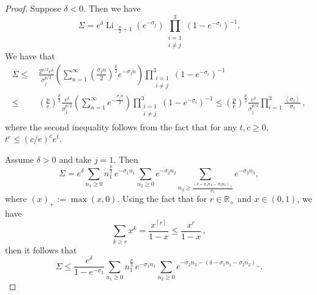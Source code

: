 \documentclass[10pt,a4paper]{amsart}
\newcommand		{\R}		{\RR}
\newcommand		{\RR}		{\mathbb R}			%
\newcommand		{\bangle}[1]	{\lt\langle #1\rt\rangle}
\newcommand		{\ceil}[1]		{\lt\lceil{#1}\rt\rceil}
\newcommand		{\lt}			{\left}				%
\newcommand		{\rt}			{\right}			%
\newcommand		{\weight}[1]	{\bangle{#1}}	%
\begin{document}
	\begin{proof}
        Suppose $\delta<0$. Then we have 
        \begin{equation*}
            \Sigma=e^\delta\operatorname{Li}_{-\frac{p}{2}+1}(e^{-\sigma_j}) \prod_{\substack{i=1\\ i\ne j}}^3 (1-e^{-\sigma_i})^{-1}.
        \end{equation*}
        We have that 
        \begin{align*}
            \Sigma \le&\, \frac{2^{p/2}e^\delta}{\sigma_j^{p/2}} \lt(\sum^\infty_{n=1} \lt(\frac{\sigma_j n}{2}\rt)^{\frac{p}{2}} e^{-\sigma_j n}\rt)\prod_{\substack{i=1\\ i\ne j}}^3 (1-e^{-\sigma_i})^{-1} \\
            \le&\, \lt(\frac{p}{e}\rt)^{\frac{p}{2}}\frac{e^\delta}{\sigma_j^{p/2}} \lt(\sum^\infty_{n=1} e^{-\frac{\sigma_j n}{2}}\rt)\prod_{\substack{i=1\\ i\ne j}}^3 (1-e^{-\sigma_i})^{-1}\le \lt(\frac{p}{e}\rt)^{\frac{p}{2}}\frac{e^\delta}{\sigma_j^{p/2}} \prod^3_{i=1} \frac{\weight{\sigma_i}}{\sigma_i}\,,
        \end{align*}
        where the second inequality follows from the fact that for any $t,c\geq 0$, $t^c \leq \lt(c/e\rt)^c e^t$.

        
		Assume $\delta>0$ and take $j=1$. Then
		\begin{equation*}
			\Sigma 
            = e^{\delta}\sum_{n_1\geq 0} n_1^\frac{p}{2}\,e^{-\sigma_1 n_1} \sum_{n_2\geq 0} e^{-\sigma_2 n_2} \sum_{n_3 \geq \frac{(\delta-\sigma_1 n_1-\sigma_2 n_2)_+}{\sigma_3}} e^{-\sigma_3 n_3} ,
		\end{equation*}
        where $(x)_+:= \max(x, 0)$. Using the fact that for $r\in\R_+$ and $x\in(0,1)$, we have
		\begin{equation*}
			\sum_{k\geq r} x^k = \frac{x^{\ceil{r}}}{1-x} \leq \frac{x^r}{1-x} \, ,
		\end{equation*}
		then it follows that
		\begin{equation*}
			\Sigma \leq \frac{e^\delta}{1-e^{-\sigma_3}} \sum_{n_1\geq 0} n_1^\frac{p}{2}\,e^{-\sigma_1 n_1} \sum_{n_2\geq 0} e^{-\sigma_2 n_2 - (\delta-\sigma_1 n_1-\sigma_2 n_2)_+} .
		\end{equation*}
        

\end{proof}
\end{document}
